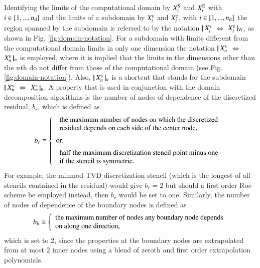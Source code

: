 \documentclass{warpdoc}
\newcommand{\alb}{\vspace{0.2cm}\\} %
\newcommand{\nd}{{n_{\rm d}}}
\newcommand{\bb}{{b_b}}
\newcommand{\br}{{b_r}}
\newcommand{\loope}{{\rm e}}
\newcommand{\loops}{{\rm s}}
\newcommand{\loopE}{{\rm E}}
\newcommand{\loopS}{{\rm S}}
\newcommand\subdomain[3]{$ | \! | \, #2 $ $\Leftrightarrow$ $#3 \, | \! |_{#1}$}
\newcommand\subdomainshort[2]{$| \! | \, #2 \, | \! |_{#1}$}
\begin{document}
Identifying the limits of the computational domain by $X_i^\loopS$ and $X_i^\loopE$
with $i \in [1, ..., \nd]$ and the limits of a subdomain by $X_i^\loops$ and $X_i^\loope$,
with $i \in [1, ..., \nd]$
the region spanned by the subdomain is referred to by the notation
\subdomain{\forall i}{X_i^\loops}{X_i^\loope}, as shown in Fig. \ref{fig:domain-notation}.
For a subdomain with limits different from the computational domain limits in
only one dimension the notation \subdomain{n}{X_n^\loops}{X_n^\loope} is employed,
where it is implied that the limits in the dimensions other than the $n$th do
not differ from those of the computational domain (see Fig. \ref{fig:domain-notation}).
Also, \subdomainshort{n}{X_n^\loops} is a shortcut that stands for the subdomain
\subdomain{n}{X_n^\loops}{X_n^\loops}.
A property that is used in conjunction with the domain decomposition algorithms
is the number of nodes of dependence of the discretized residual, $b_r$, which
is defined as
%
\begin{equation}
 \br \equiv
  \left\{
   \begin{array}{l}
     \begin{array}{l}
       \rm the~maximum~number~of~nodes~on~which~the~discretized\\
       \rm residual~depends~on~each~side~of~the~center~node,
     \end{array}\alb
     \rm or,\alb
     \begin{array}{l}
       \rm half~the~maximum~discretization~stencil~point~minus~one\\
       \rm if~the~stencil~is~symmetric.
     \end{array}
   \end{array}
  \right.
\end{equation}
%
For example, the minmod TVD discretization stencil (which is the longest of all stencils
contained in the residual) would give $\br=2$ but should a first order Roe scheme
be employed instead, then $\br$ would be set to one.
Similarly, the number of nodes of dependence of the boundary nodes is defined as
%
\begin{equation}
\bb \equiv
 \left\{
    \begin{array}{l}
      \rm the~maximum~number~of~nodes~any~boundary~node~depends\\
      \rm on~along~one~direction,
    \end{array}
 \right.
\end{equation}
%
which is set to 2, since
the properties at the boundary nodes are extrapolated from at most 2 inner nodes
using a blend of zeroth and first order extrapolation polynomials.
\end{document}
